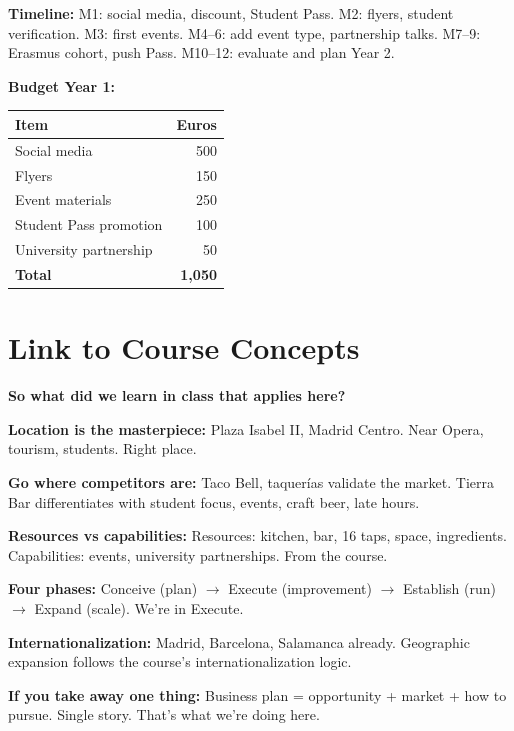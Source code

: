 \documentclass[11pt,a4paper]{article}
\begin{document}
\textbf{Timeline:} M1: social media, discount, Student Pass. M2: flyers, student verification. M3: first events. M4--6: add event type, partnership talks. M7--9: Erasmus cohort, push Pass. M10--12: evaluate and plan Year 2.

\textbf{Budget Year 1:}
\begin{center}
\small
\begin{tabular}{@{}p{8cm}r@{}}
\toprule
\rowcolor{lightorange}
\textbf{Item} & \textbf{Euros} \\
\midrule
Social media & 500 \\
Flyers & 150 \\
Event materials & 250 \\
Student Pass promotion & 100 \\
University partnership & 50 \\
\midrule
\textbf{Total} & \textbf{1,050} \\
\bottomrule
\end{tabular}
\end{center}

\vspace{1em}

\section{Link to Course Concepts}\label{sec:venture}

\textbf{So what did we learn in class that applies here?}

\textbf{Location is the masterpiece:} Plaza Isabel II, Madrid Centro. Near Opera, tourism, students. Right place.

\textbf{Go where competitors are:} Taco Bell, taquer\'ias validate the market. Tierra Bar differentiates with student focus, events, craft beer, late hours.

\textbf{Resources vs capabilities:} Resources: kitchen, bar, 16 taps, space, ingredients. Capabilities: events, university partnerships. From the course.

\textbf{Four phases:} Conceive (plan) $\rightarrow$ Execute (improvement) $\rightarrow$ Establish (run) $\rightarrow$ Expand (scale). We're in Execute.

\textbf{Internationalization:} Madrid, Barcelona, Salamanca already. Geographic expansion follows the course's internationalization logic.

\textbf{If you take away one thing:} Business plan = opportunity + market + how to pursue. Single story. That's what we're doing here.

\vspace{1.5em}
\noindent
\begin{center}
\end{center}
\end{document}
